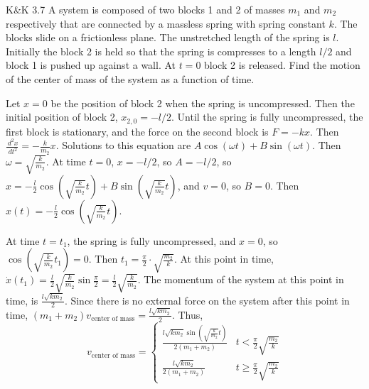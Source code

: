 \documentclass{esg8012pset}
\renewcommand{\d}{\,d}
\begin{document}
\begin{problem}{K\&K 3.7}
  A system is composed of two blocks 1 and 2 of masses $m_1$ and $m_2$ respectively that are connected by a massless spring with spring constant $k$. The blocks slide on a frictionless plane. The unstretched length of the spring is $l$. Initially the block 2 is held so that the spring is compresses to a length $l / 2$ and block 1 is pushed up against a wall. At $t = 0$ block 2 is released. Find the motion of the center of mass of the system as a function of time.
\end{problem}
\begin{solution}
  Let $x = 0$ be the position of block 2 when the spring is uncompressed.  Then the initial position of block 2, $x_{2,0} = -l/2$.  Until the spring is fully uncompressed, the first block is stationary, and the force on the second block is $F = -kx$.  Then $\frac{\d^2 x}{\d t^2} = -\frac{k}{m_2}x$.  Solutions to this equation are $A\cos(\omega t) + B\sin(\omega t)$.  Then $\omega = \sqrt{\frac{k}{m_2}}$.  At time $t = 0$, $x = -l/2$, so $A = -l/2$, so $x = -\frac{l}{2}\cos\left(\sqrt{\frac{k}{m_2}} t\right) + B\sin\left(\sqrt{\frac{k}{m_2}}t\right)$, and $v = 0$, so $B = 0$.  Then $x(t) = -\frac{l}{2}\cos\left(\sqrt{\frac{k}{m_2}} t\right)$.

  At time $t = t_1$, the spring is fully uncompressed, and $x = 0$, so $\cos\left(\sqrt{\frac{k}{m_2}} t_1 \right) = 0$.  Then $t_1 = \frac{\pi}{2}\cdot \sqrt{\frac{m_2}{k}}$.  At this point in time, $\dot x(t_1) = \frac{l}{2}\sqrt{\frac{k}{m_2}}\sin\frac{\pi}{2} = \frac{l}{2}\sqrt{\frac{k}{m_2}}$.  The momentum of the system at this point in time, is $\frac{l\sqrt{k m_2}}{2}$.  Since there is no external force on the system after this point in time, $(m_1 + m_2)v_{\text{center of mass}} = \frac{l\sqrt{k m_2}}{2}$.  Thus, $$v_{\text{center of mass}} = \begin{cases} \frac{l\sqrt{k m_2}\sin\left(\sqrt{\frac{k}{m_2}} t\right)}{2(m_1 + m_2)} & t < \frac{\pi}{2}\sqrt{\frac{m_2}{k}} \\ \frac{l\sqrt{k m_2}}{2(m_1 + m_2)} & t \geq \frac{\pi}{2}\sqrt{\frac{m_2}{k}} \end{cases}$$
\end{solution}
\end{document}
